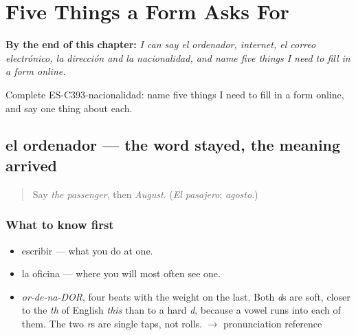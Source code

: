
\chapter{Five Things a Form Asks For}
\label{ch:el-ordenador-y-el-correo-electronico}

\begin{chapteropening}
\textbf{By the end of this chapter:} \emph{I can say el ordenador, internet, el correo electrónico, la dirección and la nacionalidad, and name five things I need to fill in a form online.}

Complete ES-C393-nacionalidad: name five things I need to fill in a form online, and say one thing about each.
\end{chapteropening}

\section[el ordenador]{el ordenador — the word stayed, the meaning arrived}

\label{lesson:ES-C393-ordenador}



\begin{quote}
Say \emph{the passenger}, then \emph{August}. (\emph{El pasajero}; \emph{agosto}.)
\end{quote}

\subsection*{What to know first}
\begin{itemize}
\raggedright
  \item escribir — what you do at one.
  \item la oficina — where you will most often see one.
\end{itemize}

\begin{sounds}
\begin{itemize}
\raggedright
  \item \emph{or-de-na-DOR}, four beats with the weight on the last. Both \emph{d}s are soft, closer to the \emph{th} of English \emph{this} than to a hard \emph{d}, because a vowel runs into each of them. The two \emph{r}s are single taps, not rolls. $\to$ pronunciation reference
\end{itemize}
\end{sounds}

